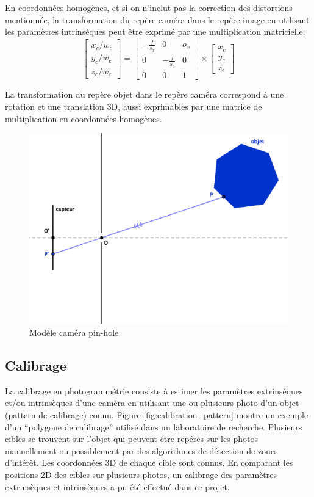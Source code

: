 \documentclass[a4paper,10pt]{scrreprt}
\begin{document}
En coordonnées homogènes, et si on n'inclut pas la correction des distortions mentionnée, la transformation du repère caméra dans le repère image en utilisant les paramètres intrinsèques peut être exprimé par une multiplication matricielle:
\begin{equation}
	\begin{bmatrix}
		x_c / w_c \\
		y_c / w_c \\
		z_c / w_c
	\end{bmatrix} = \begin{bmatrix}
		-\frac{f}{s_x} & 0 & o_x \\
		0 & -\frac{f}{s_y} & 0 \\
		0 & 0 & 1
	\end{bmatrix} \times \begin{bmatrix}
		x_c \\
		y_c \\
		z_c
	\end{bmatrix}
\end{equation}

La transformation du repère objet dans le repère caméra correspond à une rotation et une translation 3D, aussi exprimables par une matrice de multiplication en coordonnées homogènes.

\begin{figure}[p]
\center
\includegraphics[width=.6\textwidth]{pinhole.eps}
\caption{Modèle caméra pin-hole}
\label{fig:pinhole}
\end{figure}


\subsection{Calibrage}
La calibrage en photogrammétrie consiste à estimer les paramètres extrinsèques et/ou intrinsèques d'une caméra en utilisant une ou plusieurs photo d'un objet (pattern de calibrage) connu. \cite{Truc1998} Figure \ref{fig:calibration_pattern} montre un exemple d'un ``polygone de calibrage'' utilisé dans un laboratoire de recherche. \cite{Gard2009} Plusieurs cibles se trouvent sur l'objet qui peuvent être repérés sur les photos manuellement ou possiblement par des algorithmes de détection de zones d'intérêt. Les coordonnées 3D de chaque cible sont connus. En comparant les positions 2D des cibles sur plusieurs photos, un calibrage des paramètres extrinsèques et intrinsèques a pu été effectué dans ce projet.
\end{document}
